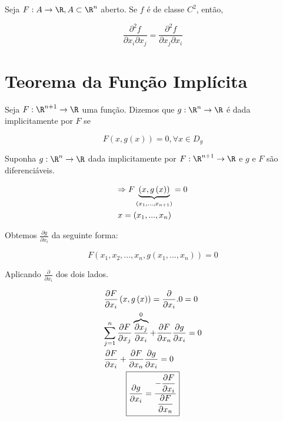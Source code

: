 \documentclass{book}
\begin{document}
\begin{teo}[de Schwarz] \label{t5}
    Seja $F: A \to \R,A \subset \R^n$ aberto. Se $f$ \'e de classe $C^2$, ent\~ao,

\[
\frac{{\partial ^2 f}}
{{\partial x_i \partial x_j }} = \frac{{\partial ^2 f}}
{{\partial x_j \partial x_i }}
\]

\end{teo}

\section{Teorema da Fun\c c\~ao Impl\'icita} \label{sec17}

\begin{defn}
Seja $F:\R^{n + 1}  \to \R$ uma fun\c c\~ao. Dizemos que $g:\R^n  \to \R$ \'e dada implicitamente por $F$ se

\[
F\left( {x,g\left( x \right)} \right) = 0,\forall x \in D_g
\]
\end{defn}

Suponha $g:\R^n  \to \R$ dada implicitamente por $F:\R^{n + 1}  \to \R$ e $g$ e $F$ s\~ao diferenci\'aveis.

\[
\begin{gathered}
   \Rightarrow F\underbrace {\left( {x,g\left( x \right)} \right)}_{\left( {x_1 ,...,x_{n + 1} } \right)} = 0 \hfill \\
x = \left( {x_1 ,...,x_n } \right) \hfill \\
\end{gathered}
\]

Obtemos $\frac{{\partial g}}{{\partial x_i }}$ da seguinte forma:

\[
F\left( {x_1 ,x_2 ,...,x_n ,g\left( {x_1 ,...,x_n } \right)} \right) = 0
\]

Aplicando $\frac{\partial}{{\partial x_i }}$ dos dois lados.

\[
\begin{gathered}
\frac{{\partial F}}
{{\partial x_i }}\left( {x,g\left( x \right)} \right) = \frac{\partial }
{{\partial x_i }}.0 = 0 \hfill \\
\sum\limits_{j = 1}^n {\frac{{\partial F}}
{{\partial x_j }}\overbrace {\frac{{\partial x_j }}
{{\partial x_i }}}^0 + \frac{{\partial F}}
{{\partial x_n }}\frac{{\partial g}}
{{\partial x_i }}}  = 0 \hfill \\
\frac{{\partial F}}
{{\partial x_i }} + \frac{{\partial F}}
{{\partial x_n }}\frac{{\partial g}}
{{\partial x_i }} = 0 \hfill \\
\boxed{\displaystyle \frac{{\partial g}}
{{\partial x_i }} = \displaystyle \frac{{\displaystyle - \frac{{\partial F}}
{{\partial x_i }}}}
{{\displaystyle \frac{{\partial F}}
{{\partial x_n }}}} \hfill} \\
\end{gathered}
\]
\end{document}
